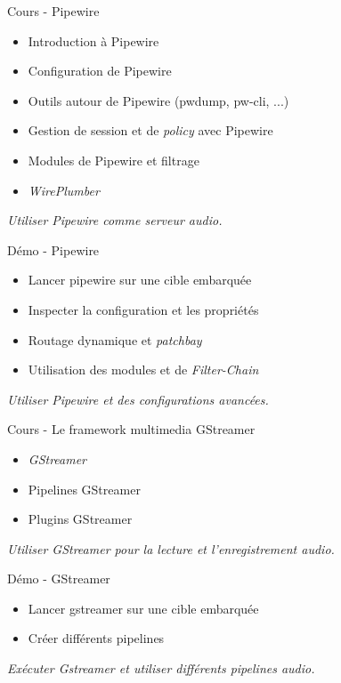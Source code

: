 \documentclass[a4paper,12pt,obeyspaces,spaces,hyphens]{article}
\begin{document}
\feagendatwocolumn
{Cours - Pipewire}
{
  \begin{itemize}
  \item Introduction à Pipewire
  \item Configuration de Pipewire
  \item Outils autour de Pipewire (pwdump, pw-cli, ...)
  \item Gestion de session et de {\em policy} avec Pipewire
  \item Modules de Pipewire et filtrage
  \item {\em WirePlumber}
  \end{itemize}
  \vspace{0.5em}
  {\em Utiliser Pipewire comme serveur audio.}
}
{Démo - Pipewire}
{
  \begin{itemize}
  \item Lancer pipewire sur une cible embarquée
  \item Inspecter la configuration et les propriétés
  \item Routage dynamique et {\em patchbay}
  \item Utilisation des modules et de {\em Filter-Chain}
  \end{itemize}
  \vspace{0.5em}
  {\em Utiliser Pipewire et des configurations avancées.}
}

\feagendatwocolumn
{Cours - Le framework multimedia GStreamer}
{
  \begin{itemize}
  \item {\em GStreamer}
  \item Pipelines GStreamer
  \item Plugins GStreamer
  \end{itemize}
  \vspace{0.5em}
  {\em Utiliser GStreamer pour la lecture et l'enregistrement audio.}
}
{Démo - GStreamer}
{
  \begin{itemize}
  \item Lancer gstreamer sur une cible embarquée
  \item Créer différents pipelines
  \end{itemize}
  \vspace{0.5em}
  {\em Exécuter Gstreamer et utiliser différents pipelines audio.}
}
\end{document}
